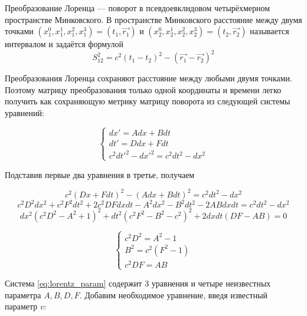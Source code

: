 \documentclass{article}
\begin{document}
Преобразование Лоренца --- поворот в псевдоевклидовом четырёхмерном пространстве Минковского. В пространстве Минковского расстояние между двумя точками $\left(x^0_1, x^1_1, x^2_1, x^3_1\right)=\left(t_1, \vec{r_1}\right)$ и $\left(x^0_2, x^1_2, x^2_2, x^3_2\right)=\left(t_2, \vec{r_2}\right)$ называется интервалом и задаётся формулой
\begin{equation}
    S_{12}^2=c^2\left(t_1-t_2\right)^2-\left(\vec{r_1}-\vec{r_2}\right)^2
\end{equation}

Преобразования Лоренца сохраняют расстояние между любыми двумя точками. Поэтому матрицу преобразования только одной координаты и времени легко получить как сохраняющую метрику матрицу поворота из следующей системы уравнений:

\begin{equation}\label{eq:lorentz_x}
    \begin{cases}
    dx'=Adx+Bdt\\
    dt'=Ddx+Fdt\\
    c^2dt'^2-dx'^2=c^2dt^2-dx^2
    \end{cases}
\end{equation}

Подставив первые два уравнения в третье, получаем

\begin{equation*}
    c^2\left(Dx+Fdt\right)^2-\left(Adx+Bdt\right)^2=c^2dt^2-dx^2
\end{equation*}
\begin{equation*}
    c^2D^2dx^2+c^2F^2dt^2+2c^2DFdxdt-A^2dx^2-B^2dt^2-2ABdxdt=c^2dt^2-dx^2
\end{equation*}
\begin{equation*}
    dx^2\left(c^2D^2-A^2+1\right)^2+dt^2\left(c^2F^2-B^2-c^2\right)^2+2dxdt\left(DF-AB\right)=0
\end{equation*}

\begin{equation}\label{eq:lorentz_param}
    \begin{cases}
    c^2D^2=A^2-1\\
    B^2=c^2\left(F^2-1\right)\\
    c^2DF=AB
    \end{cases}
\end{equation}

Система \eqref{eq:lorentz_param} содержит 3 уравнения и четыре неизвестных параметра $A, B, D, F$. Добавим необходимое уравнение, введя известный параметр $v$:
\end{document}
